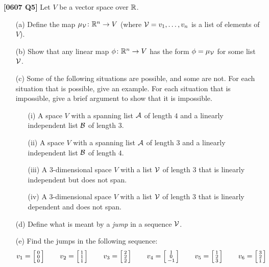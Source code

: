 \documentclass[a4paper]{article}
\begin{document}
\begin{problem}\textbf{[0607 Q5]}
 Let $V$ be a vector space over ${\mathbb{R}}$.
 \begin{itemize}
  \item[(a)] Define the map $\mu_{\mathcal{V}}\colon{\mathbb{R}}^n\to V$ (where
   $\mathcal{V}=v_1,\dotsc,v_n$ is a list of elements of $V$). 
  \item[(b)] Show that any linear map $\phi\colon{\mathbb{R}}^n\to V$ has the form
   $\phi=\mu_{\mathcal{V}}$ for some list $\mathcal{V}$.  
  \item[(c)] Some of the following situations are possible, and some
   are not.  For each situation that is possible, give an example.
   For each situation that is impossible, give a brief argument to
   show that it is impossible.  
   \begin{itemize}
    \item[(i)] A space $V$ with a spanning list $\mathcal{A}$ of length $4$
     and a linearly independent list $\mathcal{B}$ of length $3$.
    \item[(ii)] A space $V$ with a spanning list $\mathcal{A}$ of length $3$
     and a linearly independent list $\mathcal{B}$ of length $4$.
    \item[(iii)] A $3$-dimensional space $V$ with a list $\mathcal{V}$ of
     length $3$ that is linearly independent but does not span.
    \item[(iv)] A $3$-dimensional space $V$ with a list $\mathcal{V}$ of
     length $3$ that is linearly dependent and does not span. 
   \end{itemize}
  \item[(d)] Define what is meant by a \emph{jump} in a sequence
   $\mathcal{V}$. 
  \item[(e)] Find the jumps in the following sequence:
   \[ v_1 = \left[\begin{smallmatrix} 0\\0\\0  \end{smallmatrix}\right] \hspace{2em}
      v_2 = \left[\begin{smallmatrix} 1\\1\\1  \end{smallmatrix}\right] \hspace{2em}
      v_3 = \left[\begin{smallmatrix} 2\\2\\2  \end{smallmatrix}\right] \hspace{2em}
      v_4 = \left[\begin{smallmatrix} 1\\0\\-1 \end{smallmatrix}\right] \hspace{2em}
      v_5 = \left[\begin{smallmatrix} 1\\2\\3  \end{smallmatrix}\right] \hspace{2em}
      v_6 = \left[\begin{smallmatrix} 3\\2\\1  \end{smallmatrix}\right]
   \]
 \end{itemize}
\end{problem}
\end{document}
